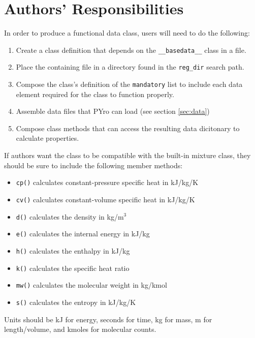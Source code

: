 \section{Authors' Responsibilities}
In order to produce a functional data class, users will need to do the following:
\begin{enumerate}
\item Create a class definition that depends on the \verb|__basedata__| class in a file.
\item Place the containing file in a directory found in the \verb|reg_dir| search path.
\item Compose the class's definition of the \verb|mandatory| list to include each data element required for the class to function properly.
\item Assemble data files that PYro can load (see section \ref{sec:data})
\item Compose class methods that can access the resulting data dicitonary to calculate properties.
\end{enumerate}

If authors want the class to be compatible with the built-in mixture class, they should be sure to include the following member methods:
\begin{itemize}
\item \verb|cp()| calculates constant-pressure specific heat in kJ/kg/K
\item \verb|cv()| calculates constant-volume specific heat in kJ/kg/K
\item \verb|d()| calculates the density in kg/m$^3$
\item \verb|e()| calculates the internal energy in kJ/kg
\item \verb|h()| calculates the enthalpy in kJ/kg
\item \verb|k()| calculates the specific heat ratio
\item \verb|mw()| calculates the molecular weight in kg/kmol
\item \verb|s()| calculates the entropy in kJ/kg/K
\end{itemize}
Units should be kJ for energy, seconds for time, kg for mass, m for length/volume, and kmoles for molecular counts.

